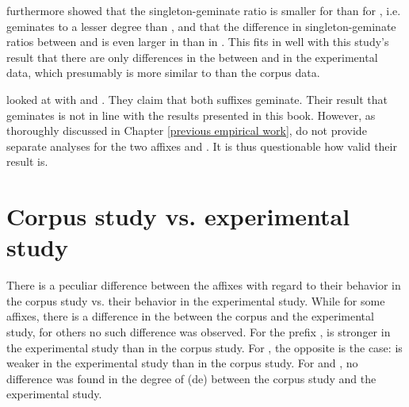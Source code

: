 \cite{Oh.2012} furthermore showed that the singleton-geminate ratio is smaller for  than for , i.e.  geminates to a lesser degree than , and that the difference in singleton-geminate ratios between  and  is even larger in  than in . 
This fits in well with this study's result that there are only differences in the  between  and  in the experimental data, which presumably is more similar to  than the corpus data.

\cite{Kotzor.2016} looked at  with  and . They claim that both suffixes geminate. Their result that  geminates is not in line with the results presented in this book. However, as thoroughly discussed in Chapter \ref{previous empirical work}, \cite{Kotzor.2016} do not provide separate analyses for the two affixes  and . It is thus questionable how valid their result is. 


\section{Corpus study vs. experimental study}


There is a peculiar difference between the affixes with regard to their behavior in the corpus study vs. their behavior in the experimental study.
While for some affixes, there is a difference in the  between the corpus and the experimental study, for others no such difference was observed. For the prefix ,  is stronger in the experimental study than in the corpus study. For , the opposite is the case:  is weaker in the experimental study than in the corpus study. For  and , no difference was found in the degree of (de) between the corpus study and the experimental study.

